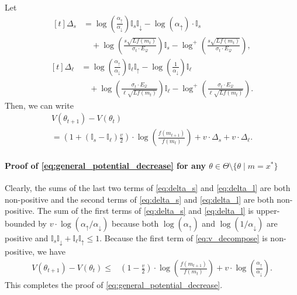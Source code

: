 \documentclass[journal]{IEEEtran}
\renewcommand{\leq}{\leqslant} %
\theoremstyle{definition}
\newcommand{\indup}{\mathbb{I}_{\uparrow}}
\newcommand{\inddown}{\mathbb{I}_{\downarrow}}
\newcommand{\inds}{\mathbb{I}_{s}}
\newcommand{\indl}{\mathbb{I}_{\ell}}
\newcommand{\aup}{\alpha_{\uparrow}}
\newcommand{\adown}{\alpha_{\downarrow}}
\begin{document}
Let 
\begin{equation}
\begin{aligned}[t]
    \Delta_s &= \log\left(\frac{\aup}{\adown}\right)\inds\inddown
    -\log\left(\aup\right)\cdot\inds
    \\
    &\quad+ \log\left(\frac{s\sqrt{ Lf(m_{t})}}{\sigma_t\cdot E_\mathcal{Q} }\right)\inds
    - \log^+ \left(\frac{s\sqrt{Lf(m_t)}}{\sigma_t \cdot E_\mathcal{Q}}\right),
    \label{eq:delta_s}
\end{aligned}
\end{equation}
\begin{equation}
\begin{aligned}[t]
    \Delta_{\ell} &=
    \log\left(\frac{\aup}{\adown}\right)\indl\indup
    -\log\left(\frac{1}{\adown}\right)\indl
    \\
    &\quad+ \log\left(\frac{\sigma_t\cdot E_\mathcal{Q}}{\ell\sqrt{ Lf(m_{t})}}\right)\indl
    - \log^+ \left(\frac{\sigma_t \cdot E_\mathcal{Q}}{\ell\sqrt{Lf(m_t)}}\right).
    \label{eq:delta_l}
\end{aligned}
\end{equation}
Then, we can write
\begin{multline}
V(\theta_{t+1}) - V(\theta_t)
\\
=
\left(1+(\inds-\indl)\frac{v}{2}\right)\cdot\log\left(\frac{f(m_{t+1})}{f(m_t)}\right)
+ v \cdot \Delta_s + v \cdot \Delta_\ell.
\label{eq:v_decompose}
\end{multline}

\paragraph{Proof of \eqref{eq:general_potential_decrease} for any $\theta\in\Theta\setminus\{\theta\mid m= x^*\}$}
Clearly, the sums of the last two terms of \eqref{eq:delta_s} and \eqref{eq:delta_l} are both non-positive and the second terms of \eqref{eq:delta_s} and \eqref{eq:delta_l} are both non-positive. 
The sum of the first terms of \eqref{eq:delta_s} and \eqref{eq:delta_l} is upper-bounded by $v\cdot\log(\aup / \adown)$ because both $\log(\aup)$ and $\log(1/\adown)$ are positive and $\inds\inddown + \indl\indup \leq 1$.
Because the first term of \eqref{eq:v_decompose} is non-positive, we have
\begin{align}
V(\theta_{t+1}) - V(\theta_t)
\leq& \left(1-\frac{v}{2}\right)\cdot\log\left(\frac{f(m_{t+1})}{f(m_t)}\right)
+v\cdot\log\left(\frac{\aup}{\adown}\right)
\label{eq:hold_above_in_general_case}
.
\end{align}
This completes the proof of \eqref{eq:general_potential_decrease}.
\end{document}
